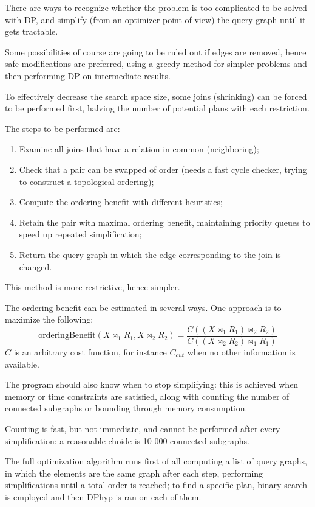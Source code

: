 There are ways to recognize whether the problem is too complicated to be solved with DP, and simplify (from an optimizer point of view) the query graph until it gets tractable. 

Some possibilities of course are going to be ruled out if edges are removed, hence safe modifications are preferred, using a greedy method for simpler problems and then performing DP on intermediate results. 

To effectively decrease the search space size, some joins (shrinking) can be forced to be performed first, halving the number of potential plans with each restriction. 

The steps to be performed are:
\begin{enumerate}
	\item Examine all joins that have a relation in common (neighboring);
	\item Check that a pair can be swapped of order (needs a fast cycle checker, trying to construct a topological ordering);
	\item Compute the ordering benefit with different heuristics;
	\item Retain the pair with maximal ordering benefit, maintaining priority queues to speed up repeated simplification;
	\item Return the query graph in which the edge corresponding to the join is changed.
\end{enumerate}
This method is more restrictive, hence simpler. 

The ordering benefit can be estimated in several ways. One approach is to maximize the following:
$$\text{orderingBenefit}(X \bowtie_1 R_1, X \bowtie_2 R_2) = \frac{C((X \bowtie_1 R_1) \bowtie_2 R_2)}{C((X \bowtie_2 R_2) \bowtie_1 R_1)}$$
$C$ is an arbitrary cost function, for instance $C_{out}$ when no other information is available.

The program should also know when to stop simplifying: this is achieved when memory or time constraints are satisfied, along with counting the number of connected subgraphs or bounding through memory consumption.

Counting is fast, but not immediate, and cannot be performed after every simplification: a reasonable choide is 10 000 connected subgraphs.

The full optimization algorithm runs first of all computing a list of query graphs, in which the elements are the same graph after each step, performing simplifications until a total order is reached; to find a specific plan, binary search is employed and then DPhyp is ran on each of them.

